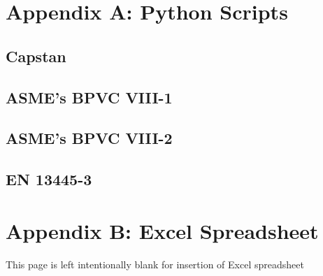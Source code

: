 \renewcommand{\thesection}{A.\arabic{section}}
\chapter{Appendix A: Python Scripts}
\label{appendix:a}
\nopagebreak
\begin{small}
	
	\section{Capstan}
	\label{appendix:a0}
	
	\pagebreak	
	
	\section{ASME's BPVC VIII-1}
	\label{appendix:a1}
	
	\pagebreak
	
	\section{ASME's BPVC VIII-2}
	\label{appendix:a2}
	
	\pagebreak
	
	\section{EN 13445-3}
	\label{appendix:a3}
	

\end{small}

\renewcommand{\thesection}{B.\arabic{section}}
\chapter{Appendix B: Excel Spreadsheet}
\label{appendix:b}

\vfill
\begin{center}
This page is left intentionally blank for insertion of Excel spreadsheet
\end{center}
\vfill



